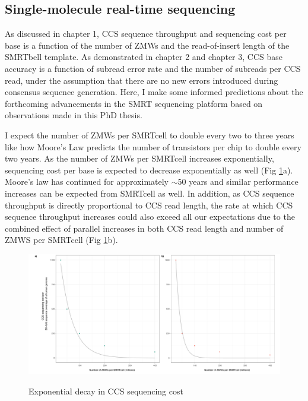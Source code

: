 \subsection{Single-molecule real-time sequencing}

As discussed in chapter 1, CCS sequence throughput and sequencing cost per base is a function of the number of ZMWs and the read-of-insert length of the SMRTbell template. As demonstrated in chapter 2 and chapter 3, CCS base accuracy is a function of subread error rate and the number of subreads per CCS read, under the assumption that there are no new errors introduced during consensus sequence generation. Here, I make some informed predictions about the forthcoming advancements in the SMRT sequencing platform based on observations made in this PhD thesis.

I expect the number of ZMWs per SMRTcell to double every two to three years like how Moore’s Law predicts the number of transistors per chip to double every two years. As the number of ZMWs per SMRTcell increases exponentially, sequencing cost per base is expected to decrease exponentially as well (Fig \ref{figure:ccs_sequence_throughput}a). Moore’s law has continued for approximately $\sim$50 years and similar performance increases can be expected from SMRTcell as well. In addition, as CCS sequence throughput is directly proportional to CCS read length, the rate at which CCS sequence throughput increases could also exceed all our expectations due to the combined effect of parallel increases in both CCS read length and number of ZMWS per SMRTcell (Fig \ref{figure:ccs_sequence_throughput}b). 

\begin{figure}[h]
\caption{Exponential decay in CCS sequencing cost}\label{figure:ccs_sequence_throughput}
\begin{centering}
\includegraphics[width=\textwidth]{exponential_decay_in_ccs_sequencing_cost.pdf} \\ \smallskip
\end{centering}
\end{figure}

